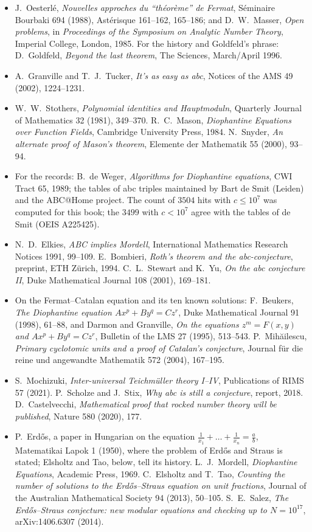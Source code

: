 \begin{itemize}
\item J.~Oesterl\'e, \emph{Nouvelles approches du ``th\'eor\`eme'' de Fermat}, S\'eminaire Bourbaki 694 (1988), Ast\'erisque 161--162, 165--186; and
D.~W.~Masser, \emph{Open problems}, in \emph{Proceedings of the Symposium on Analytic Number Theory}, Imperial College, London, 1985. For the
history and Goldfeld's phrase: D.~Goldfeld, \emph{Beyond the last theorem}, The Sciences, March/April 1996.
\item A.~Granville and T.~J.~Tucker, \emph{It's as easy as abc}, Notices of the AMS 49 (2002), 1224--1231.
\item W.~W.~Stothers, \emph{Polynomial identities and Hauptmoduln}, Quarterly Journal of Mathematics 32 (1981), 349--370. R.~C.~Mason,
\emph{Diophantine Equations over Function Fields}, Cambridge University Press, 1984. N.~Snyder, \emph{An alternate proof of Mason's theorem}, Elemente
der Mathematik 55 (2000), 93--94.
\item For the records: B.~de Weger, \emph{Algorithms for Diophantine equations}, CWI Tract 65, 1989; the tables of abc triples maintained by Bart de Smit
(Leiden) and the ABC@Home project. The count of $3504$ hits with $c\le10^7$ was computed for this book; the $3499$ with $c<10^7$ agree with the tables of de Smit (OEIS A225425).
\item N.~D.~Elkies, \emph{ABC implies Mordell}, International Mathematics Research Notices 1991, 99--109. E.~Bombieri, \emph{Roth's theorem and the
abc-conjecture}, preprint, ETH Z\"urich, 1994. C.~L.~Stewart and K.~Yu, \emph{On the abc conjecture II}, Duke Mathematical Journal 108 (2001),
169--181.
\item On the Fermat--Catalan equation and its ten known solutions: F.~Beukers, \emph{The Diophantine equation $Ax^p+By^q=Cz^r$}, Duke Mathematical
Journal 91 (1998), 61--88, and Darmon and Granville, \emph{On the equations $z^m=F(x,y)$ and $Ax^p+By^q=Cz^r$}, Bulletin of the LMS 27 (1995), 513--543.
P.~Mih\u ailescu, \emph{Primary cyclotomic units and a proof of Catalan's conjecture}, Journal f\"ur die reine und angewandte Mathematik 572 (2004),
167--195.
\item S.~Mochizuki, \emph{Inter-universal Teichm\"uller theory I--IV}, Publications of RIMS 57 (2021). P.~Scholze and J.~Stix, \emph{Why abc is still a
conjecture}, report, 2018. D.~Castelvecchi, \emph{Mathematical proof that rocked number theory will be published}, Nature 580 (2020), 177.
\item P.~Erd\H os, a paper in Hungarian on the equation $\frac1{x_1}+\dots+\frac1{x_n}=\frac ab$, Matematikai Lapok 1 (1950), where the
problem of Erd\H os and Straus is stated; Elsholtz and Tao, below, tell its history. L.~J.~Mordell, \emph{Diophantine Equations}, Academic Press, 1969.
C.~Elsholtz and T.~Tao, \emph{Counting the number of solutions to the Erd\H os--Straus equation on unit fractions}, Journal of the Australian
Mathematical Society 94 (2013), 50--105. S.~E.~Salez, \emph{The Erd\H os--Straus conjecture: new modular equations and checking up to
$N=10^{17}$}, arXiv:1406.6307 (2014).
\end{itemize}

